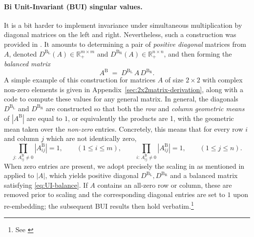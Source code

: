 \documentclass[11pt,a4paper]{article}
\begin{document}
\paragraph{Bi Unit-Invariant (BUI) singular values.} It is a bit harder to implement invariance under simultaneous multiplication by diagonal matrices on the left and right. Nevertheless, such a construction was provided in \cite{uhlmann-main2}. It amounts to determining a pair of \emph{positive diagonal} matrices from $A$, denoted ${D}^{\mathrm{B_L}}(A) \in \mathbb{R}^{m\times m}_+$ and ${D}^{\mathrm{B_R}}(A) \in \mathbb{R}^{n\times n}_+$, and then forming the \emph{balanced matrix}
\begin{equation}\label{eq:ui-bal-def}
A^\mathrm{B} 
\;=\; 
{D}^{\mathrm{B_L}}\,A\,{D}^{\mathrm{B_R}}.
\end{equation}
A simple example of this construction for matrices $A$ of size $2\times2$ with complex non-zero elements is given in Appendix~\ref{sec:2x2matrix-derivation}, along with a code to compute these values for any general matrix. In general, the diagonals ${D}^{\mathrm{B_L}}$ and ${D}^{\mathrm{B_R}}$ are constructed so that both the \emph{row} and \emph{column} \emph{geometric means} of $|A^\mathrm{B}|$ are equal to $1$, or equivalently the products are 1, with the geometric mean taken over the \emph{non-zero} entries. Concretely, this means that for every row $i$ and column $j$ which are not identically zero,
\begin{equation}\label{eq:UI-balance}
\prod_{j:\,A^\mathrm{B}_{ij}\neq 0} |A^\mathrm{B}_{ij}|=1,\qquad(1\le i\le m),
\qquad
\prod_{i:\,A^\mathrm{B}_{ij}\neq 0}\!\!\! |A^\mathrm{B}_{ij}|=1,\qquad(1\le j\le n).
\end{equation}
When zero entries are present, we adopt precisely the scaling in \cite[Program II]{ROTHBLUM1992159} as mentioned in \cite{uhlmann-main2} applied to $|A|$, which yields positive diagonal $D^{\mathrm{B_L}}, D^{\mathrm{B_R}}$ and a balanced matrix satisfying \cref{eq:UI-balance}. If $A$ contains an all-zero row or column, these are removed prior to scaling and the corresponding diagonal entries are set to $1$ upon re-embedding; the subsequent BUI results then hold verbatim.\footnote{See \cite[Thm.~4.2, Lem.~4.3, Thm.~4.4, and Appendix C]{uhlmann-main2}}
\end{document}
